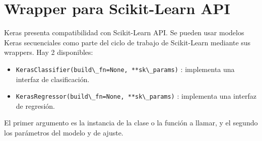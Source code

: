 \section{Wrapper para Scikit-Learn API}
Keras presenta compatibilidad con Scikit-Learn API. Se pueden usar modelos Keras secuenciales como parte del ciclo de trabajo de Scikit-Learn mediante sus wrappers. Hay 2 disponibles:
\begin{itemize}[noitemsep]
\item \lstinline{KerasClassifier(build\_fn=None, **sk\_params)} : implementa una interfaz de clasificación.
\item \lstinline{KerasRegressor(build\_fn=None, **sk\_params)} : implementa una interfaz de regresión.
\end{itemize}
El primer argumento es la instancia de la clase o la función a llamar, y el segundo los parámetros del modelo y de ajuste.
